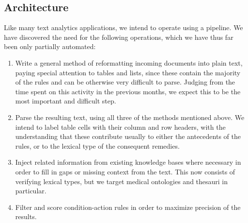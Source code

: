 \documentclass[12pt,letterpaper]{article}
\begin{document}
\subsection*{Architecture}
Like many text analytics applications, we intend to operate using a pipeline. We have discovered the need for the following operations, which we have thus far been only partially automated:

\begin{enumerate}
\item Write a general method of reformatting incoming documents into plain text, paying special attention to tables and lists, since these contain the majority of the rules and can be otherwise very difficult to parse. Judging from the time spent on this activity in the previous months, we expect this to be the most important and difficult step.
\item Parse the resulting text, using all three of the methods mentioned above. We intend to label table cells with their column and row headers, with the understanding that these contribute usually to either the antecedents of the rules, or to the lexical type of the consequent remedies. 
\item Inject related information from existing knowledge bases where necessary in order to fill in gaps or missing context from the text. This now consists of verifying lexical types, but we target medical ontologies and thesauri in particular.
\item Filter and score condition-action rules in order to maximize precision of the results.
\end{enumerate}
\end{document}
